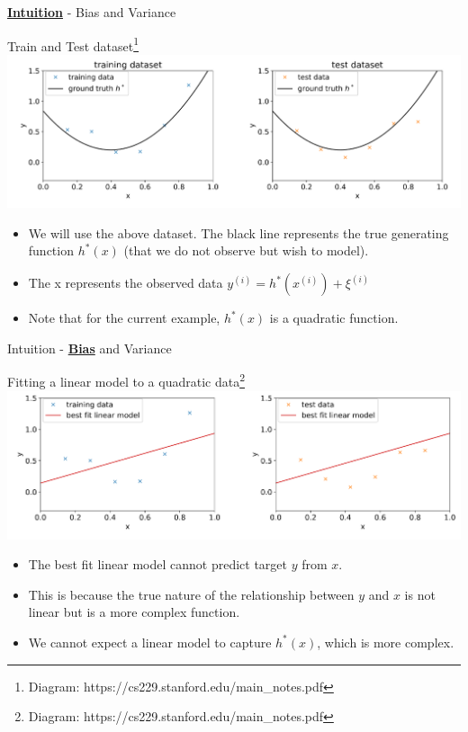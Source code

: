 \documentclass{beamer}
\begin{document}
\begin{frame}{\underline{\textbf{Intuition}} - Bias and Variance}
    \begin{center}
        \scriptsize{Train and Test dataset\footnote{\tiny{Diagram: https://cs229.stanford.edu/main\_notes.pdf}}}
        \includegraphics[width=\linewidth]{images/biasvar/TrainAndTest.png} \\
    \end{center}

    \begin{itemize}
        \item We will use the above dataset. The black line represents the true generating function $h^*(x)$ (that we do not observe but wish to model).
        \item The x represents the observed data $y^{(i)} = h^*(x^{(i)}) + \xi^{(i)}$
        \item Note that for the current example, $h^*(x)$ is a quadratic function.
    \end{itemize}
\end{frame}

\begin{frame}{Intuition - \underline{\textbf{Bias}} and Variance}
    \begin{center}
                \scriptsize{Fitting a linear model to a quadratic data\footnote{\tiny{Diagram: https://cs229.stanford.edu/main\_notes.pdf}}}
        \includegraphics[width=\linewidth]{images/biasvar/BiasTrainAndTest.png}
    \end{center}
    \begin{itemize}
        \item The best fit linear model cannot predict target $y$ from $x$.
        \item This is because the true nature of the relationship between $y$ and $x$ is not linear but is a more complex function.
        \item We cannot expect a linear model to capture $h^*(x)$, which is more complex.
    \end{itemize}
    
\end{frame}
\end{document}
